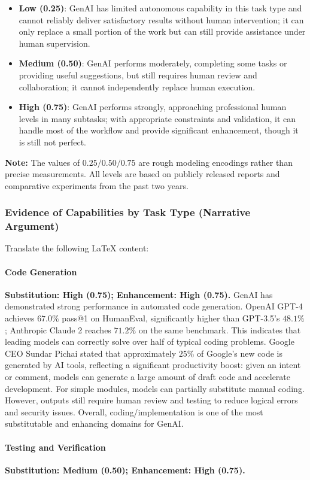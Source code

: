 \begin{itemize}
    \item \textbf{Low (0.25)}: GenAI has limited autonomous capability in this task type and cannot reliably deliver satisfactory results without human intervention; it can only replace a small portion of the work but can still provide assistance under human supervision.
    \item \textbf{Medium (0.50)}: GenAI performs moderately, completing some tasks or providing useful suggestions, but still requires human review and collaboration; it cannot independently replace human execution.
    \item \textbf{High (0.75)}: GenAI performs strongly, approaching professional human levels in many subtasks; with appropriate constraints and validation, it can handle most of the workflow and provide significant enhancement, though it is still not perfect.
\end{itemize}\noindent\textbf{Note:} The values of $0.25/0.50/0.75$ are rough modeling encodings rather than precise measurements. All levels are based on publicly released reports and comparative experiments from the past two years.\subsubsection{Evidence of Capabilities by Task Type (Narrative Argument)}Translate the following LaTeX content:\paragraph{Code Generation}\textbf{Substitution: High (0.75); Enhancement: High (0.75).}
GenAI has demonstrated strong performance in automated code generation. OpenAI GPT-4 achieves $67.0\%$ pass@1 on HumanEval, significantly higher than GPT-3.5's $48.1\%$; Anthropic Claude 2 reaches $71.2\%$ on the same benchmark. This indicates that leading models can correctly solve over half of typical coding problems. Google CEO Sundar Pichai stated that approximately $25\%$ of Google's new code is generated by AI tools, reflecting a significant productivity boost: given an intent or comment, models can generate a large amount of draft code and accelerate development. For simple modules, models can partially substitute manual coding. However, outputs still require human review and testing to reduce logical errors and security issues. Overall, coding/implementation is one of the most substitutable and enhancing domains for GenAI.\paragraph{Testing and Verification}\textbf{Substitution: Medium (0.50); Enhancement: High (0.75).}
